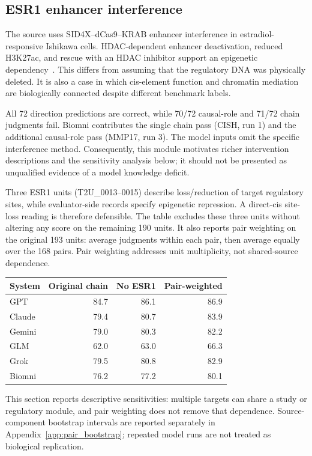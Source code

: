 \subsection{ESR1 enhancer interference}
The source uses SID4X--dCas9--KRAB enhancer interference in estradiol-responsive Ishikawa cells. HDAC-dependent enhancer deactivation, reduced H3K27ac, and rescue with an HDAC inhibitor support an epigenetic dependency~\cite{carleton2017enhancer}. This differs from assuming that the regulatory DNA was physically deleted. It is also a case in which cis-element function and chromatin mediation are biologically connected despite different benchmark labels.

All 72 direction predictions are correct, while 70/72 causal-role and 71/72 chain judgments fail. Biomni contributes the single chain pass (CISH, run 1) and the additional causal-role pass (MMP17, run 3). The model inputs omit the specific interference method. Consequently, this module motivates richer intervention descriptions and the sensitivity analysis below; it should not be presented as unqualified evidence of a model knowledge deficit.

Three ESR1 units (T2U\_0013--0015) describe loss/reduction of target regulatory sites, while evaluator-side records specify epigenetic repression. A direct-cis site-loss reading is therefore defensible. The table excludes these three units without altering any score on the remaining 190 units. It also reports pair weighting on the original 193 units: average judgments within each pair, then average equally over the 168 pairs. Pair weighting addresses unit multiplicity, not shared-source dependence.
\begin{center}
\begin{tabular}{lrrr}
\toprule
System & Original chain & No ESR1 & Pair-weighted \\
\midrule
GPT & 84.7 & 86.1 & 86.9 \\
Claude & 79.4 & 80.7 & 83.9 \\
Gemini & 79.0 & 80.3 & 82.2 \\
GLM & 62.0 & 63.0 & 66.3 \\
Grok & 79.5 & 80.8 & 82.9 \\
Biomni & 76.2 & 77.2 & 80.1 \\
\bottomrule
\end{tabular}
\end{center}
This section reports descriptive sensitivities: multiple targets can share a study or regulatory module, and pair weighting does not remove that dependence. Source-component bootstrap intervals are reported separately in Appendix~\ref{app:pair_bootstrap}; repeated model runs are not treated as biological replication.


